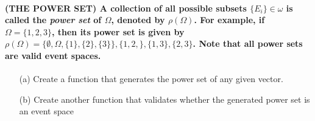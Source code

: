 \documentclass[12pt,letterpaper]{article}
\begin{document}
\paragraph{(THE POWER SET) A collection of all possible subsets $\{E_{i}\}\in\omega $ is called the \textit{power set} of $\Omega$, denoted by $\rho(\Omega)$. For example, if $\Omega=\{1,2,3\}$, then its power set is given by $\rho(\Omega)=\{\emptyset,\Omega, \{1\}, \{2\}, \{3\} \}, \{1,2,\}, \{1,3\}, \{2,3\}$. Note that all power sets are valid event spaces.}

\begin{enumerate}
\item[(a)] Create a function that generates the power set of any given vector.
\item[(b)] Create another function that validates whether the generated power set is an event space
\end{enumerate}
\end{document}
